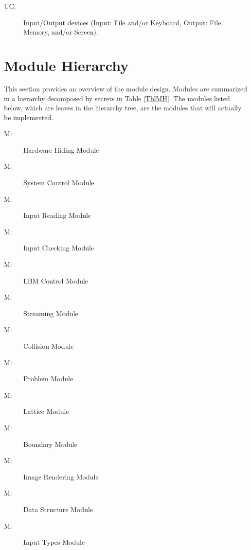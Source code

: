 \documentclass[12pt, titlepage]{article}
\newcounter{ucnum}
\newcommand{\uctheucnum}{UC\theucnum}
\newcounter{mnum}
\newcommand{\mthemnum}{M\themnum}
\begin{document}
\begin{description}
\item[ \uctheucnum \label{ucIO}:] Input/Output devices
  (Input: File and/or Keyboard, Output: File, Memory, and/or Screen).
\end{description}

\section{Module Hierarchy} \label{SecMH}

This section provides an overview of the module design. Modules are summarized
in a hierarchy decomposed by secrets in Table \ref{TblMH}. The modules listed
below, which are leaves in the hierarchy tree, are the modules that will
actually be implemented.

\begin{description}
\item [ \mthemnum \label{mHH}:] Hardware Hiding Module
\item [ \mthemnum \label{mSC}:] System Control Module
\item [ \mthemnum \label{mIR}:] Input Reading Module
\item [ \mthemnum \label{mIC}:] Input Checking Module
\item [ \mthemnum \label{mLC}:] LBM Control Module
\item [ \mthemnum \label{mST}:] Streaming Module
\item [ \mthemnum \label{mCO}:] Collision Module
\item [ \mthemnum \label{mPR}:] Problem Module
\item [ \mthemnum \label{mLA}:] Lattice Module
\item [ \mthemnum \label{mBO}:] Boundary Module
\item [ \mthemnum \label{mOU}:] Image Rendering Module
\item [ \mthemnum \label{mDS}:] Data Structure Module
\item [ \mthemnum \label{mIT}:] Input Types Module
\end{description}
\end{document}
